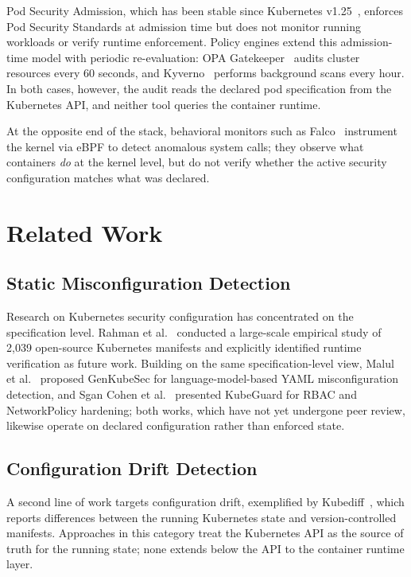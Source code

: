 \documentclass[conference]{IEEEtran}
\begin{document}
Pod Security Admission, which has been stable since Kubernetes v1.25~\cite{k8spsa2022}, enforces Pod Security Standards at admission time but does not monitor running workloads or verify runtime enforcement. Policy engines extend this admission-time model with periodic re-evaluation: OPA Gatekeeper~\cite{gatekeeper2024} audits cluster resources every 60 seconds, and Kyverno~\cite{kyverno2024} performs background scans every hour. In both cases, however, the audit reads the declared pod specification from the Kubernetes API, and neither tool queries the container runtime.

At the opposite end of the stack, behavioral monitors such as Falco~\cite{falco2024} instrument the kernel via eBPF to detect anomalous system calls; they observe what containers \emph{do} at the kernel level, but do not verify whether the active security configuration matches what was declared.

\section{Related Work}

\subsection{Static Misconfiguration Detection}

Research on Kubernetes security configuration has concentrated on the specification level. Rahman et al.~\cite{rahman2023} conducted a large-scale empirical study of 2,039 open-source Kubernetes manifests and explicitly identified runtime verification as future work. Building on the same specification-level view, Malul et al.~\cite{malul2024} proposed GenKubeSec for language-model-based YAML misconfiguration detection, and Sgan Cohen et al.~\cite{sgancohen2025} presented KubeGuard for RBAC and NetworkPolicy hardening; both works, which have not yet undergone peer review, likewise operate on declared configuration rather than enforced state.

\subsection{Configuration Drift Detection}

A second line of work targets configuration drift, exemplified by Kubediff~\cite{kubediff2020}, which reports differences between the running Kubernetes state and version-controlled manifests. Approaches in this category treat the Kubernetes API as the source of truth for the running state; none extends below the API to the container runtime layer.
\end{document}
